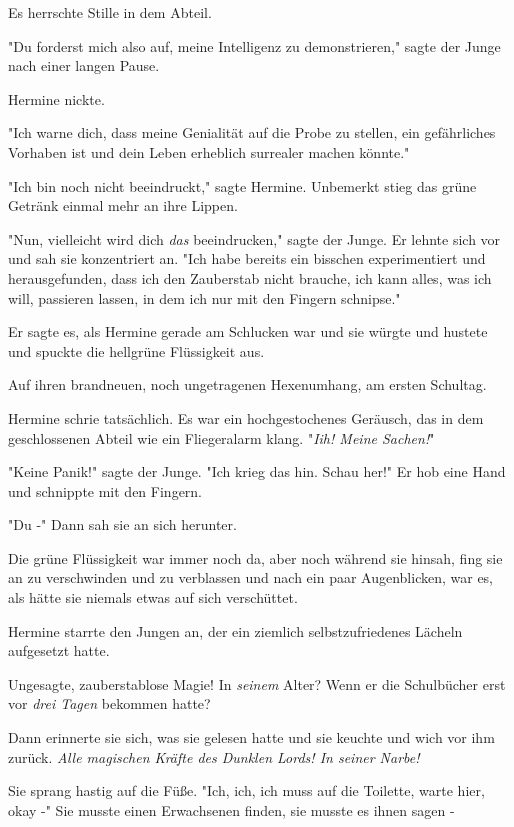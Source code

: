 {Es herrschte Stille in dem Abteil.

"Du forderst mich also auf, meine Intelligenz zu demonstrieren," sagte der Junge nach einer langen Pause.

Hermine nickte.

"Ich warne dich, dass meine Genialität auf die Probe zu stellen, ein gefährliches Vorhaben ist und dein Leben erheblich surrealer machen könnte."

"Ich bin noch nicht beeindruckt," sagte Hermine. Unbemerkt stieg das grüne Getränk einmal mehr an ihre Lippen.

"Nun, vielleicht wird dich \emph{das} beeindrucken," sagte der Junge. Er lehnte sich vor und sah sie konzentriert an. "Ich habe bereits ein bisschen experimentiert und herausgefunden, dass ich den Zauberstab nicht brauche, ich kann alles, was ich will, passieren lassen, in dem ich nur mit den Fingern schnipse."

Er sagte es, als Hermine gerade am Schlucken war und sie würgte und hustete und spuckte die hellgrüne Flüssigkeit aus.

Auf ihren brandneuen, noch ungetragenen Hexenumhang, am ersten Schultag.

Hermine schrie tatsächlich. Es war ein hochgestochenes Geräusch, das in dem geschlossenen Abteil wie ein Fliegeralarm klang. "\emph{Iih! Meine Sachen!}"

"Keine Panik!" sagte der Junge. "Ich krieg das hin. Schau her!" Er hob eine Hand und schnippte mit den Fingern.

"Du -" Dann sah sie an sich herunter.

Die grüne Flüssigkeit war immer noch da, aber noch während sie hinsah, fing sie an zu verschwinden und zu verblassen und nach ein paar Augenblicken, war es, als hätte sie niemals etwas auf sich verschüttet.

Hermine starrte den Jungen an, der ein ziemlich selbstzufriedenes Lächeln aufgesetzt hatte.

Ungesagte, zauberstablose Magie! In \emph{seinem} Alter? Wenn er die Schulbücher erst vor \emph{drei Tagen} bekommen hatte?

Dann erinnerte sie sich, was sie gelesen hatte und sie keuchte und wich vor ihm zurück. \emph{Alle magischen Kräfte des Dunklen Lords! In seiner Narbe!}

Sie sprang hastig auf die Füße. "Ich, ich, ich muss auf die Toilette, warte hier, okay -" Sie musste einen Erwachsenen finden, sie musste es ihnen sagen -

}
